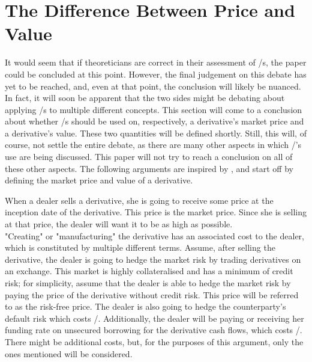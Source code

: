 \documentclass[main.tex]{subfiles}
\begin{document}
    \section{The Difference Between Price and Value}
    \label{sec:price-versus-value}

    It would seem that if theoreticians are correct in their assessment of \FVA/s,
    the paper could be concluded at this point.
    However, the final judgement on this debate has yet to be reached,
    and, even at that point, the conclusion will likely be nuanced.
    In fact, it will soon be apparent that the two sides might be debating
    about applying \FVA/s to multiple different concepts.
    This section will come to a conclusion about whether \FVA/s should be used
    on, respectively, a derivative's market price and a derivative's value.
    These two quantities will be defined shortly. 
    Still, this will, of course, not settle the entire debate,
    as there are many other aspects in which \FVA/'s use are being discussed.
    This paper will not try to reach a conclusion on all of these other aspects.
    The following arguments are inspired by \textcite{Ruiz2015XVA},
    and start off by defining the market price and value of a derivative.

    When a dealer sells a derivative, she is going to receive some price at the inception date of the derivative.
    This price is the market price.
    Since she is selling at that price, the dealer will want it to be as high as possible.
    \\
    "Creating" or "manufacturing" the derivative has an associated cost to the dealer,
    which is constituted by multiple different terms.
    Assume, after selling the derivative, the dealer is going to hedge the market risk
    by trading derivatives on an exchange.
    This market is highly collateralised and has a minimum of credit risk;
    for simplicity, assume that the dealer is able to hedge the market risk by paying
    the price of the derivative without credit risk. 
    This price will be referred to as the risk-free price.
    The dealer is also going to hedge the counterparty's default risk which costs \CVA/.
    Additionally, the dealer will be paying or receiving her funding rate on unsecured borrowing
    for the derivative cash flows, which costs \FVA/.
    There might be additional costs, 
    but, for the purposes of this argument, only the ones mentioned will be considered.
    
\end{document}
